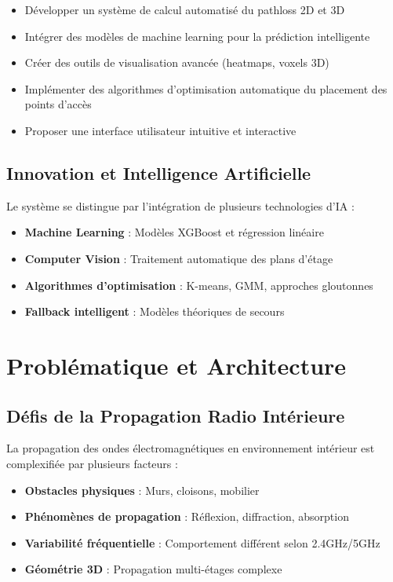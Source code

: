 \documentclass[12pt,a4paper]{article}
\begin{document}
\begin{itemize}
    \item Développer un système de calcul automatisé du pathloss 2D et 3D
    \item Intégrer des modèles de machine learning pour la prédiction intelligente
    \item Créer des outils de visualisation avancée (heatmaps, voxels 3D)
    \item Implémenter des algorithmes d'optimisation automatique du placement des points d'accès
    \item Proposer une interface utilisateur intuitive et interactive
\end{itemize}

\subsection{Innovation et Intelligence Artificielle}

Le système se distingue par l'intégration de plusieurs technologies d'IA :
\begin{itemize}
    \item \textbf{Machine Learning} : Modèles XGBoost et régression linéaire
    \item \textbf{Computer Vision} : Traitement automatique des plans d'étage
    \item \textbf{Algorithmes d'optimisation} : K-means, GMM, approches gloutonnes
    \item \textbf{Fallback intelligent} : Modèles théoriques de secours
\end{itemize}

\section{Problématique et Architecture}

\subsection{Défis de la Propagation Radio Intérieure}

La propagation des ondes électromagnétiques en environnement intérieur est complexifiée par plusieurs facteurs :

\begin{itemize}
    \item \textbf{Obstacles physiques} : Murs, cloisons, mobilier
    \item \textbf{Phénomènes de propagation} : Réflexion, diffraction, absorption
    \item \textbf{Variabilité fréquentielle} : Comportement différent selon 2.4GHz/5GHz
    \item \textbf{Géométrie 3D} : Propagation multi-étages complexe
\end{itemize}
\end{document}
